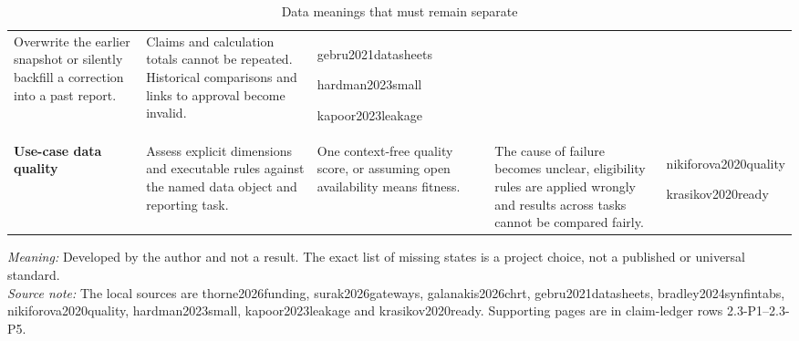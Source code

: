 \begin{table}[p]
\begin{tabularx}{\textwidth}{@{}P{0.15\textwidth}P{0.24\textwidth}P{0.19\textwidth}Y>{\RaggedRight\arraybackslash\scriptsize}p{0.14\textwidth}@{}}
    Overwrite the earlier snapshot or silently backfill a correction into a past report. &
    Claims and calculation totals cannot be repeated. Historical comparisons and links to approval become invalid. &
    gebru2021\allowbreak datasheets\par hardman2023\allowbreak small\par kapoor2023\allowbreak leakage \\
    \addlinespace
    \textbf{Use-case data quality} &
    Assess explicit dimensions and executable rules against the named data object and reporting task. &
    One context-free quality score, or assuming open availability means fitness. &
    The cause of failure becomes unclear, eligibility rules are applied wrongly and results across tasks cannot be compared fairly. &
    nikiforova2020\allowbreak quality\par krasikov2020\allowbreak ready \\
    \bottomrule
  \end{tabularx}

  \caption{Data meanings that must remain separate}
  \label{tab:data-semantics-matrix}
  \vspace{3pt}

  \parbox{\textwidth}{\scriptsize
    \textit{Meaning:} Developed by the author and not a result. The exact list of missing states is a project choice, not a published or universal standard.\\
    \textit{Source note:} The local sources are thorne2026funding, surak2026gateways, galanakis2026chrt, gebru2021datasheets, bradley2024synfintabs, nikiforova2020quality, hardman2023small, kapoor2023leakage and krasikov2020ready. Supporting pages are in claim-ledger rows 2.3-P1--2.3-P5.
  }
\end{table}
\clearpage
